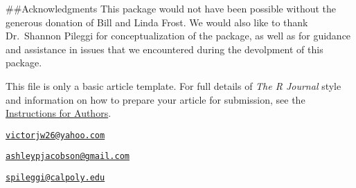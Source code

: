 \#\#Acknowledgments This package would not have been possible without
the generous donation of Bill and Linda Frost. We would also like to
thank Dr.~Shannon Pileggi for conceptualization of the package, as well
as for guidance and assistance in issues that we encountered during the
devolpment of this package.

This file is only a basic article template. For full details of
\emph{The R Journal} style and information on how to prepare your
article for submission, see the
\href{https://journal.r-project.org/share/author-guide.pdf}{Instructions
for Authors}.




\address{%
Victor Wilson\\
California Polytechnic State University, San Luis Obispo - Statistics
Department\\
\\
}
\href{mailto:victorjw26@yahoo.com}{\nolinkurl{victorjw26@yahoo.com}}

\address{%
Ashley Jacobson\\
California Polytechnic State University, San Luis Obispo - Statistics
Department\\
\\
}
\href{mailto:ashleypjacobson@gmail.com}{\nolinkurl{ashleypjacobson@gmail.com}}

\address{%
Shannon Pileggi\\
California Polytechnic State University, San Luis Obispo - Statistics
Department\\
\\
}
\href{mailto:spileggi@calpoly.edu}{\nolinkurl{spileggi@calpoly.edu}}

